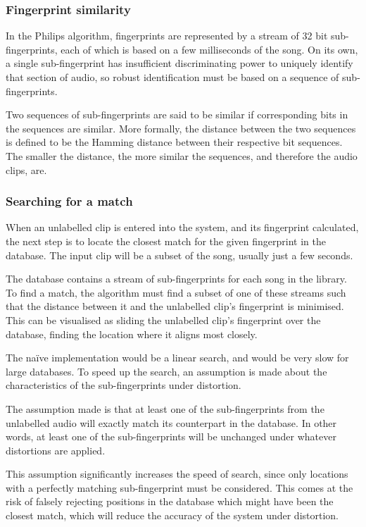 \documentclass[12pt,a4paper,twoside,openright]{report}
\begin{document}
\subsubsection{Fingerprint similarity}

In the Philips algorithm, fingerprints are represented by a stream of 32 bit sub-fingerprints, each of which is based on a few milliseconds of the song. On its own, a single sub-fingerprint has insufficient discriminating power to uniquely identify that section of audio, so robust identification must be based on a sequence of sub-fingerprints.

Two sequences of sub-fingerprints are said to be similar if corresponding bits in the sequences are similar. More formally, the distance between the two sequences is defined to be the Hamming distance between their respective bit sequences. The smaller the distance, the more similar the sequences, and therefore the audio clips, are.


\subsubsection{Searching for a match}

When an unlabelled clip is entered into the system, and its fingerprint calculated, the next step is to locate the closest match for the given fingerprint in the database. The input clip will be a subset of the song, usually just a few seconds.

The database contains a stream of sub-fingerprints for each song in the library. To find a match, the algorithm must find a subset of one of these streams such that the distance between it and the unlabelled clip's fingerprint is minimised. This can be visualised as sliding the unlabelled clip's fingerprint over the database, finding the location where it aligns most closely.

The na\"ive implementation would be a linear search, and would be very slow for large databases. To speed up the search, an assumption is made about the characteristics of the sub-fingerprints under distortion. 

The assumption made is that at least one of the sub-fingerprints from the unlabelled audio will exactly match its counterpart in the database. In other words, at least one of the sub-fingerprints will be unchanged under whatever distortions are applied.

This assumption significantly increases the speed of search, since only locations with a perfectly matching sub-fingerprint must be considered. This comes at the risk of falsely rejecting positions in the database which might have been the closest match, which will reduce the accuracy of the system under distortion.
\end{document}
